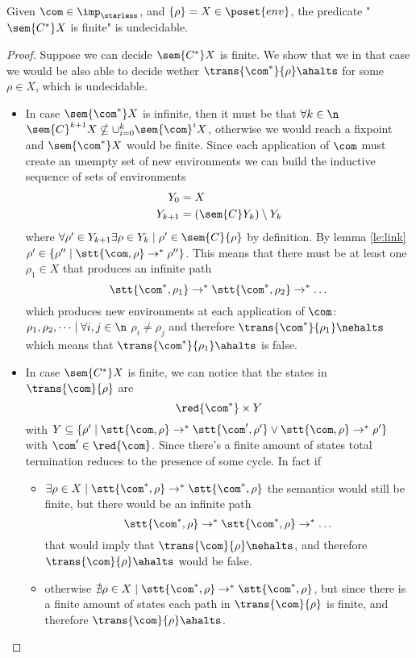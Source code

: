 \begin{lemma}\label{le:infiniteness}
  Given \(\com\in\imp_\starless\), and \(\{\rho\} = X \in
  \poset{env}\), the predicate "\(\sem{C^*}X\) is finite" is
  undecidable.
\end{lemma}

\begin{proof}
  Suppose we can decide \(\sem{C^*}X\) is finite. We show that we in
  that case we would be also able to decide wether
  \(\trans{\com^*}{\rho}\ahalts\) for some \(\rho \in X\), which is
  undecidable.%
  \begin{itemize}
  \item In case \(\sem{\com^*}X\) is infinite, then it must be that
    \(\forall k \in \n\) \(\sem{C}^{k+1}X \nsubseteq
    \cup_{i=0}^k\sem{\com}^iX\), otherwise we would reach a fixpoint
    and \(\sem{\com^*}X\) would be finite. Since each application of
    \(\com\) must create an unempty set of new environments we can
    build the inductive sequence of sets of environments
    \begin{align*}
      Y_0 & = X \\
      Y_{k+1} & = (\sem{C}Y_k)\setminus Y_k
    \end{align*}
    where \(\forall \rho' \in Y_{k+1} \exists \rho \in Y_k \mid \rho'
    \in \sem{C}\{\rho\}\) by definition. By lemma \ref{le:link}
    \(\rho' \in \{\rho'' \mid \stt{\com, \rho} \to^* \rho''\}\). This
    means that there must be at least one \(\rho_1\in X\) that
    produces an infinite path \[\stt{\com^*, \rho_1}\to^*\stt{\com^*,
      \rho_2}\to^*\dots \] which produces new environments at each
    application of \(\com\): \(\rho_1, \rho_2, \dots \mid \forall i,j
    \in \n\) \(\rho_i \neq \rho_j\) and therefore
    \(\trans{\com^*}{\rho_1} \nehalts\) which means that
    \(\trans{\com^*}{\rho_1}\ahalts\) is false.
  \item In case \(\sem{C^*}X\) is finite, we can notice that the
    states in \(\trans{\com}{\rho}\) are \[\red{\com^*}\times Y\] with
    \(Y \subseteq \{\rho'\mid \stt{\com, \rho} \to^* \stt{\com',
      \rho'} \vee \stt{\com,\rho} \to^* \rho'\}\) with \(\com'\in
    \red{\com}\). Since there's a finite amount of states total
    termination reduces to the presence of some cycle. In fact if
    \begin{itemize}
    \item \(\exists \rho \in X \mid \stt{\com^*, \rho} \to^*
      \stt{\com^*, \rho}\) the semantics would still be finite, but
      there would be an infinite path \[\stt{\com^*, \rho} \to^*
      \stt{\com^*, \rho} \to^* \dots\] that would imply that
      \(\trans{\com}{\rho} \nehalts\), and therefore
      \(\trans{\com}{\rho} \ahalts\) would be false.
    \item otherwise \(\nexists \rho \in X \mid \stt{\com^*, \rho}
      \to^* \stt{\com^*, \rho}\), but since there is a finite amount
      of states each path in \(\trans{\com}{\rho}\) is finite, and
      therefore \(\trans{\com}{\rho}\ahalts\).
    \end{itemize}
  \end{itemize}
\end{proof}
